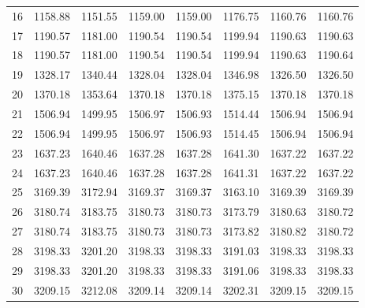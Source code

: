 \documentclass[10pt,oneside]{article}
\begin{document}
\begin{table}[h!]
\begin{tabular}{cccccccc}
16 &   1158.88 & 1151.55 & 1159.00 & 1159.00 &      1176.75 & 1160.76 & 1160.76 \\
17 &   1190.57 & 1181.00 & 1190.54 & 1190.54 &      1199.94 & 1190.63 & 1190.63 \\
18 &   1190.57 & 1181.00 & 1190.54 & 1190.54 &      1199.94 & 1190.63 & 1190.64 \\
19 &   1328.17 & 1340.44 & 1328.04 & 1328.04 &      1346.98 & 1326.50 & 1326.50 \\
20 &   1370.18 & 1353.64 & 1370.18 & 1370.18 &      1375.15 & 1370.18 & 1370.18 \\
21 &   1506.94 & 1499.95 & 1506.97 & 1506.93 &      1514.44 & 1506.94 & 1506.94 \\
22 &   1506.94 & 1499.95 & 1506.97 & 1506.93 &      1514.45 & 1506.94 & 1506.94 \\
23 &   1637.23 & 1640.46 & 1637.28 & 1637.28 &      1641.30 & 1637.22 & 1637.22 \\
24 &   1637.23 & 1640.46 & 1637.28 & 1637.28 &      1641.31 & 1637.22 & 1637.22 \\
25 &   3169.39 & 3172.94 & 3169.37 & 3169.37 &      3163.10 & 3169.39 & 3169.39 \\
26 &   3180.74 & 3183.75 & 3180.73 & 3180.73 &      3173.79 & 3180.63 & 3180.72 \\
27 &   3180.74 & 3183.75 & 3180.73 & 3180.73 &      3173.82 & 3180.82 & 3180.72 \\
28 &   3198.33 & 3201.20 & 3198.33 & 3198.33 &      3191.03 & 3198.33 & 3198.33 \\
29 &   3198.33 & 3201.20 & 3198.33 & 3198.33 &      3191.06 & 3198.33 & 3198.33 \\
30 &   3209.15 & 3212.08 & 3209.14 & 3209.14 &      3202.31 & 3209.15 & 3209.15 \\
\bottomrule
\end{tabular}
\end{table}

\clearpage
\end{document}
